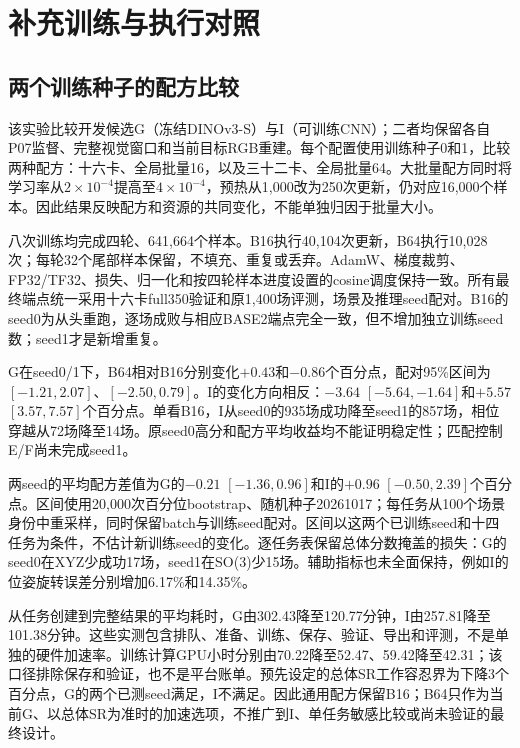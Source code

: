 \clearpage
\section{补充训练与执行对照}
\label{app:additional}
\label{app:additional_zh}

\subsection{两个训练种子的配方比较}
该实验比较开发候选G（冻结DINOv3-S）与I（可训练CNN）；二者均保留各自P07监督、完整视觉窗口和当前目标RGB重建。每个配置使用训练种子0和1，比较两种配方：十六卡、全局批量16，以及三十二卡、全局批量64。大批量配方同时将学习率从$2\times10^{-4}$提高至$4\times10^{-4}$，预热从1,000改为250次更新，仍对应16,000个样本。因此结果反映配方和资源的共同变化，不能单独归因于批量大小。

八次训练均完成四轮、641,664个样本。B16执行40,104次更新，B64执行10,028次；每轮32个尾部样本保留，不填充、重复或丢弃。AdamW、梯度裁剪、FP32/TF32、损失、归一化和按四轮样本进度设置的cosine调度保持一致。所有最终端点统一采用十六卡full350验证和原1,400场评测，场景及推理seed配对。B16的seed0为从头重跑，逐场成败与相应BASE2端点完全一致，但不增加独立训练seed数；seed1才是新增重复。

\begingroup
\renewenvironment{table*}[1][]{\begin{readingtable}}{\end{readingtable}}


\endgroup

G在seed0/1下，B64相对B16分别变化$+0.43$和$-0.86$个百分点，配对95\%区间为$[-1.21,2.07]$、$[-2.50,0.79]$。I的变化方向相反：$-3.64$ $[-5.64,-1.64]$和$+5.57$ $[3.57,7.57]$个百分点。单看B16，I从seed0的935场成功降至seed1的857场，相位穿越从72场降至14场。原seed0高分和配方平均收益均不能证明稳定性；匹配控制E/F尚未完成seed1。

两seed的平均配方差值为G的$-0.21$ $[-1.36,0.96]$和I的$+0.96$ $[-0.50,2.39]$个百分点。区间使用20,000次百分位bootstrap、随机种子20261017；每任务从100个场景身份中重采样，同时保留batch与训练seed配对。区间以这两个已训练seed和十四任务为条件，不估计新训练seed的变化。逐任务表保留总体分数掩盖的损失：G的seed0在XYZ少成功17场，seed1在SO(3)少15场。辅助指标也未全面保持，例如I的位姿旋转误差分别增加6.17\%和14.35\%。

从任务创建到完整结果的平均耗时，G由302.43降至120.77分钟，I由257.81降至101.38分钟。这些实测包含排队、准备、训练、保存、验证、导出和评测，不是单独的硬件加速率。训练计算GPU小时分别由70.22降至52.47、59.42降至42.31；该口径排除保存和验证，也不是平台账单。预先设定的总体SR工作容忍界为下降3个百分点，G的两个已测seed满足，I不满足。因此通用配方保留B16；B64只作为当前G、以总体SR为准时的加速选项，不推广到I、单任务敏感比较或尚未验证的最终设计。

